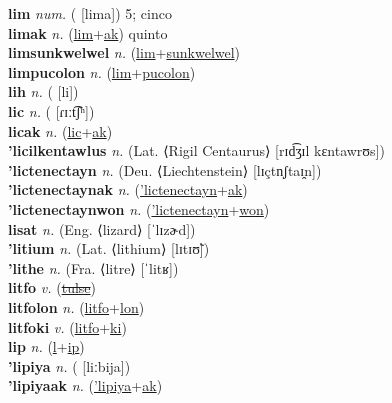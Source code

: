 \textbf{lim} \textit{num.} ( [lima])
5; cinco \label{lim} \\
\textbf{limak} \textit{n.} (\hyperref[lim]{lim}+\hyperref[ak]{ak})
quinto \label{limak} \\
\textbf{limsunkwelwel} \textit{n.} (\hyperref[lim]{lim}+\hyperref[sunkwelwel]{sunkwelwel})
 \label{limsunkwelwel} \\
\textbf{limpucolon} \textit{n.} (\hyperref[lim]{lim}+\hyperref[pucolon]{pucolon})
 \label{limpucolon} \\
\textbf{lih} \textit{n.} ( [li])
 \label{lih} \\
\textbf{lic} \textit{n.} ( [ɾɪːt͡ʃʰ])
 \label{lic} \\
\textbf{licak} \textit{n.} (\hyperref[lic]{lic}+\hyperref[ak]{ak})
 \label{licak} \\
\textbf{'licilkentawlus} \textit{n.} (Lat. ⟨Rigil Centaurus⟩ [rɪd͡ʒɪl kɛntawrʊs])
 \label{'licilkentawlus} \\
\textbf{'lictenectayn} \textit{n.} (Deu. ⟨Liechtenstein⟩ [lɪçtn̩ʃtaɪ̯n])
 \label{'lictenectayn} \\
\textbf{'lictenectaynak} \textit{n.} (\hyperref['lictenectayn]{'lictenectayn}+\hyperref[ak]{ak})
 \label{'lictenectaynak} \\
\textbf{'lictenectaynwon} \textit{n.} (\hyperref['lictenectayn]{'lictenectayn}+\hyperref[won]{won})
 \label{'lictenectaynwon} \\
\textbf{lisat} \textit{n.} (Eng. ⟨lizard⟩ [ˈlɪzɚd])
 \label{lisat} \\
\textbf{'litium} \textit{n.} (Lat. ⟨lithium⟩ [lɪtɪʊ̃])
 \label{'litium} \\
\textbf{'lithe} \textit{n.} (Fra. ⟨litre⟩ [ˈlitʁ])
 \label{'lithe} \\
\textbf{litfo} \textit{v.} (\hyperref[tulse]{\sout{tulse}})
 \label{litfo} \\
\textbf{litfolon} \textit{n.} (\hyperref[litfo]{litfo}+\hyperref[lon]{lon})
 \label{litfolon} \\
\textbf{litfoki} \textit{v.} (\hyperref[litfo]{litfo}+\hyperref[ki]{ki})
 \label{litfoki} \\
\textbf{lip} \textit{n.} (\hyperref[l]{l}+\hyperref[ip]{ip})
 \label{lip} \\
\textbf{'lipiya} \textit{n.} ( [liːbija])
 \label{'lipiya} \\
\textbf{'lipiyaak} \textit{n.} (\hyperref['lipiya]{'lipiya}+\hyperref[ak]{ak})
 \label{'lipiyaak} \\
